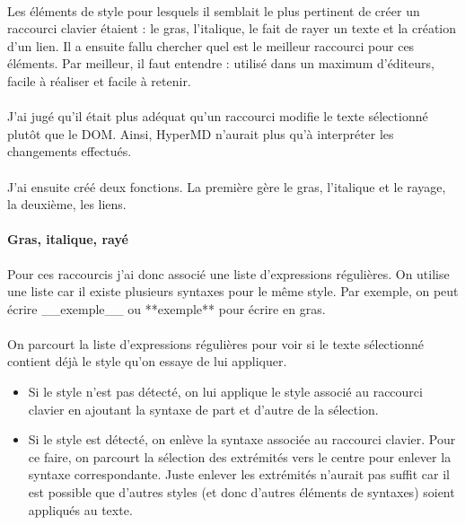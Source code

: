 \documentclass[12pt]{article}
\begin{document}
\paragraph{}
Les éléments de style pour lesquels il semblait le plus pertinent de créer un raccourci clavier étaient : le gras, l'italique, le fait de rayer un texte et la création d'un lien. Il a ensuite fallu chercher quel est le meilleur raccourci pour ces éléments. Par meilleur, il faut entendre : utilisé dans un maximum d'éditeurs, facile à réaliser et facile à retenir.
\paragraph{}
J'ai jugé qu'il était plus adéquat qu'un raccourci modifie le texte sélectionné plutôt que le DOM. Ainsi, HyperMD n'aurait plus qu'à interpréter les changements effectués.
\paragraph{}
J'ai ensuite créé deux fonctions. La première gère le gras, l'italique et le rayage, la deuxième, les liens.

\paragraph{Gras, italique, rayé}
Pour ces raccourcis j'ai donc associé une liste d'expressions régulières. On utilise une liste car il existe plusieurs syntaxes pour le même style. Par exemple, on peut écrire \_\_exemple\_\_ ou **exemple** pour écrire en gras.
\paragraph{}
On parcourt la liste d'expressions régulières pour voir si le texte sélectionné contient déjà le style qu'on essaye de lui appliquer.
\begin{itemize}
    \item Si le style n'est pas détecté, on lui applique le style associé au raccourci clavier en ajoutant la syntaxe de part et d'autre de la sélection.
    \item Si le style est détecté, on enlève la syntaxe associée au raccourci clavier. Pour ce faire, on parcourt la sélection des extrémités vers le centre pour enlever la syntaxe correspondante. Juste enlever les extrémités n'aurait pas suffit car il est possible que d'autres styles (et donc d'autres éléments de syntaxes) soient appliqués au texte.
\end{itemize}
\end{document}
